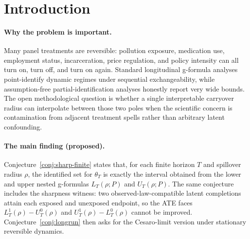 \documentclass[11pt]{article}
\theoremstyle{definition}
\theoremstyle{plain}
\theoremstyle{remark}
\begin{document}
\begin{abstract}
This proposal asks for sharp bounds on a long-run average treatment effect when
the treatment process is reversible and adjacent treatment spells may contaminate
each other by at most a scalar amount \(\rho\).  The proposed kernel is a
closed-form sequence of lower and upper nested g-formulas: at each history node,
the usual Robins outcome regression is replaced by the smallest and largest
bounded \(\rho\)-Lipschitz extension compatible with the observed reversible
panel law.  The flagship conjecture is that these formulas are not merely outer
bounds, but the exact sharp identified interval, with extremal latent joint laws
attaining every lower and upper face.  The construction is designed to collapse
to the Robins \citep{Robins1986} g-formula when \(\rho=0\) and to the
bounded-outcome Manski interval when \(\rho=\infty\).  If resolved, the result
would give empirical researchers a sensitivity parameter for reversible
dynamic treatments that sits between full sequential point identification and
assumption-free dynamic bounds.
\end{abstract}

\section{Introduction}
\paragraph{Why the problem is important.}
Many panel treatments are reversible: pollution exposure, medication use,
employment status, incarceration, price regulation, and policy intensity can all
turn on, turn off, and turn on again.  Standard longitudinal g-formula analyses
point-identify dynamic regimes under sequential exchangeability, while
assumption-free partial-identification analyses honestly report very wide
bounds.  The open methodological question is whether a single interpretable
carryover radius can interpolate between those two poles when the scientific
concern is contamination from adjacent treatment spells rather than arbitrary
latent confounding.

\paragraph{The main finding (proposed).}
Conjecture~\ref{conj:sharp-finite} states that, for each finite horizon \(T\)
and spillover radius \(\rho\), the identified set for
\(\theta_T\) is exactly the interval obtained from the lower and upper
nested g-formulas \(L_T(\rho;P)\) and \(U_T(\rho;P)\).  The same conjecture
includes the sharpness witness: two observed-law-compatible latent completions
attain each exposed and unexposed endpoint, so the ATE faces
\(L_T^1(\rho)-U_T^0(\rho)\) and \(U_T^1(\rho)-L_T^0(\rho)\) cannot be improved.
Conjecture~\ref{conj:longrun} then asks for the Cesaro-limit version under
stationary reversible dynamics.
\end{document}
